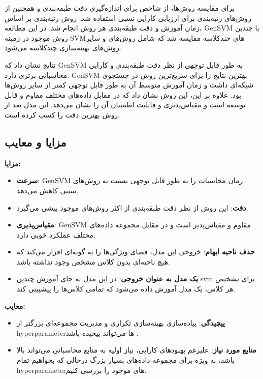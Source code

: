 \documentclass{article}
\begin{document}
برای مقایسه روش‌ها، از شاخص 
 برای اندازه‌گیری دقت طبقه‌بندی و همچنین از روش‌های رتبه‌بندی برای ارزیابی کارایی نسبی استفاده شد. روش رتبه‌بندی بر اساس زمان آموزش و دقت طبقه‌بندی هر روش انجام شد. در این مطالعه، GenSVM با چندین روش موجود در زمینه SVMهای چندکلاسه مقایسه شد که شامل روش‌های
  و سایر روش‌های بهینه‌سازی چندکلاسه می‌شود.

نتایج نشان داد که GenSVM به طور قابل توجهی از نظر دقت طبقه‌بندی و کارایی محاسباتی برتری دارد. GenSVM بهترین نتایج را برای سریع‌ترین روش در جستجوی شبکه‌ای داشت و زمان آموزش متوسط آن به طور قابل توجهی کمتر از سایر روش‌ها بود. علاوه بر این، این روش نشان داد که در مقابل داده‌های مختلف مقاوم و قابل توسعه است و مقیاس‌پذیری و قابلیت اطمینان آن را نشان می‌دهد. این مدل بعد از روش
 بهترین دقت را کسب کرده است.

\subsection{مزایا و معایب}

\textbf{مزایا:}
\begin{itemize}
    \item \textbf{سرعت}: GenSVM زمان محاسبات را به طور قابل توجهی نسبت به روش‌های سنتی کاهش می‌دهد.
    \item \textbf{دقت}: این روش از نظر دقت طبقه‌بندی از اکثر روش‌های موجود پیشی می‌گیرد.
    \item \textbf{مقیاس‌پذیری}: GenSVM مقاوم و مقیاس‌پذیر است و در مقابل مجموعه داده‌های مختلف عملکرد خوبی دارد.
    \item \textbf{حذف ناحیه ابهام}: خروجی این مدل، فضای ویژگی‌ها را به گونه‌ای افراز می‌کند که هیچ ناحیه‌ای بدون کلاس مشخص وجود نداشته باشد.
    \item \textbf{یک مدل به عنوان خروجی}: در این مدل به جای آموزش چندین svm برای تشخیص هر کلاس، یک مدل آموزش داده می‌شود که تمامی کلاس‌ها را پیشبینی کند.
\end{itemize}

\textbf{معایب:}
\begin{itemize}
    \item \textbf{پیچیدگی}: پیاده‌سازی بهینه‌سازی تکراری و مدیریت مجموعه‌ای بزرگتر از hyperparameterها
     می‌تواند پیچیده باشد .
    \item \textbf{منابع مورد نیاز}: علیرغم بهبودهای کارایی، نیاز اولیه به منابع محاسباتی می‌تواند بالا باشد، به ویژه برای مجموعه داده‌های بسیار بزرگ درحالی که بخواهیم تمام 
    hyperparameterهای 
    موجود را بررسی کنیم.
\end{itemize}
\end{document}
